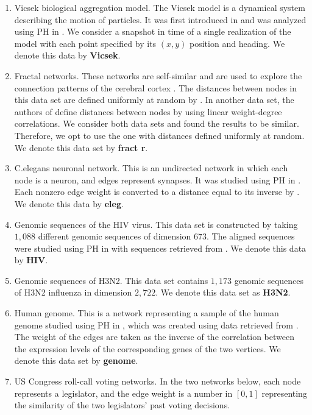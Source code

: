 \documentclass[utf8]{formatting_stuff/frontiersFPHY}
\theoremstyle{plain}
\theoremstyle{definition}
\begin{document}
\begin{enumerate}
    \item Vicsek biological aggregation model. The Vicsek model is a dynamical system describing the motion of particles.  
    It was first introduced in \cite{vicsek} and was analyzed using PH in \cite{TZH15}. We consider a snapshot in time of a single realization of the model with each point specified by its $(x,y)$ position and heading. We denote this data by \textbf{Vicsek}. 
    \item Fractal networks. These networks are self-similar and are used to explore the connection patterns of the cerebral cortex \cite{fractr}. The distances between nodes in this data set are defined uniformly at random by \cite{roadmap2017}. In another data set, the authors of \cite{roadmap2017} define distances between nodes by using linear weight-degree correlations. We consider both data sets and found the results to be similar. Therefore, we opt to use the one with distances defined uniformly at random.  
    We denote this data set by \textbf{fract r}.  
    \item C.elegans neuronal network. This is an undirected network in which each node is a neuron, and edges represent synapses. It was studied using PH in \cite{celegans}. Each nonzero edge weight is converted to a distance equal to its inverse by \cite{roadmap2017}.  
    We denote this data by \textbf{eleg}.
    \item Genomic sequences of the HIV virus. This data set is constructed by taking $1,088$ different genomic sequences of dimension $673$. The aligned sequences were studied using PH in \cite{hiv} with sequences retrieved from \cite{HIVdata}. We denote this data by \textbf{HIV}. 
    \item Genomic sequences of H3N2. This data set contains $1,173$ genomic sequences of H3N2 influenza in dimension $2,722$. We denote this data set as \textbf{H3N2}.  
    \item Human genome. This is a network representing a sample of the human genome studied using PH in \cite{celegans}, which was created using data retrieved from \cite{genome}. 
    The weight of the edges are taken as the inverse of the correlation between the expression levels of the corresponding genes of the two vertices. We denote this data set by \textbf{genome}.
    \item US Congress roll-call voting networks. In the two networks below, each node represents a legislator, and the edge weight is a number in $[0,1]$ representing the similarity of the two legislators' past voting decisions.

\end{enumerate}
\end{document}
